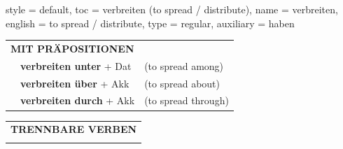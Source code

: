 \begin{verbentry}{
  style = {default},
  toc = {verbreiten (to spread / distribute)},
  name = {verbreiten},
  english = {to spread / distribute},
  type = {regular},
  auxiliary = {haben}
}
\vspace{10pt}

\begin{tabular}{lll}
\multicolumn{3}{l}{\textbf{MIT PRÄPOSITIONEN}}\\
& \textbf{verbreiten unter} + Dat & (to spread among)\\
& \textbf{verbreiten über} + Akk & (to spread about)\\
& \textbf{verbreiten durch} + Akk & (to spread through)\\
\end{tabular}
\hfill
\begin{tabular}{lll}
\multicolumn{3}{l}{\textbf{TRENNBARE VERBEN}}\\
\vspace{30pt}\end{tabular}
\vspace{-5pt}
\end{verbentry}

